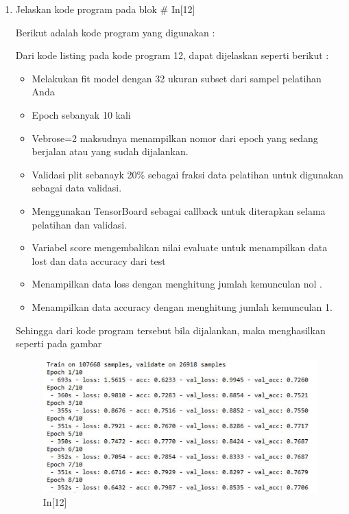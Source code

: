 \begin{enumerate}
\item Jelaskan kode program pada blok \# In[12]
\par Berikut adalah kode program yang digunakan :

\par Dari kode listing pada kode program 12, dapat dijelaskan seperti berikut :
\begin{itemize}
\item Melakukan fit model dengan 32 ukuran subset dari sampel pelatihan Anda
\item Epoch sebanyak 10 kali
\item Vebrose=2 maksudnya menampilkan nomor dari epoch yang sedang berjalan atau yang sudah dijalankan.
\item Validasi plit sebanayk 20\% sebagai fraksi data pelatihan untuk digunakan sebagai data validasi.
\item Menggunakan TensorBoard sebagai callback untuk diterapkan selama pelatihan dan validasi.
\item Variabel score mengembalikan nilai evaluate untuk menampilkan data lost dan data accuracy dari test
\item Menampilkan data loss dengan menghitung jumlah kemunculan nol .
\item Menampilkan data accuracy dengan menghitung jumlah kemunculan 1.
\end{itemize}
\par Sehingga dari kode program tersebut bila dijalankan, maka menghasilkan seperti pada gambar 
\begin{figure}[!htbp]
	\centerline{\includegraphics[width=1\textwidth]{figures/andi/p12.PNG}}
	\caption{In[12]}
\end{figure}


\end{enumerate}
